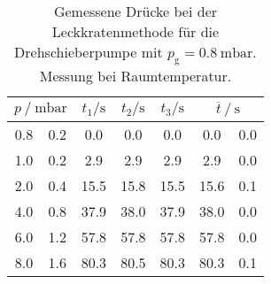\begin{table} 
\centering 
\caption{Gemessene Drücke bei der Leckkratenmethode für die Drehschieberpumpe mit $p_{\mathrm{g}}=\SI{0.8}{\milli\bar}$. Messung bei Raumtemperatur.} 
\label{tab: leck_dreh_leck_0.8.pdf} 
\begin{tabular}{S[table-format=1.1]@{${}\pm{}$} S[table-format=1.1] S S S S[table-format=1.1]@{${}\pm{}$} S[table-format=1.1] } 
\toprule  
{} & {$t_1 / \si{ \second}$} & {$t_2 / \si{ \second}$} & {$t_3 / \si{ \second}$} &  \\ 
 & 0.2 & 0.0 & 0.0 & 0.0 & 0.0 & 0.0\\ 
1.0 & 0.2 & 2.9 & 2.9 & 2.9 & 2.9 & 0.0\\ 
2.0 & 0.4 & 15.5 & 15.8 & 15.5 & 15.6 & 0.1\\ 
4.0 & 0.8 & 37.9 & 38.0 & 37.9 & 38.0 & 0.0\\ 
6.0 & 1.2 & 57.8 & 57.8 & 57.8 & 57.8 & 0.0\\ 
8.0 & 1.6 & 80.3 & 80.5 & 80.3 & 80.3 & 0.1\\ 
\bottomrule 
\end{tabular} 
\end{table}
